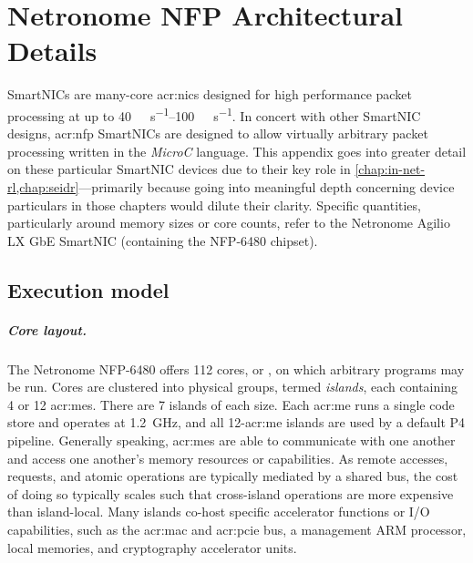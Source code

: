 \chapter{Netronome NFP Architectural Details}
\label{adx:nfp-arch}

 SmartNICs are many-core  \glspl{acr:nic} designed for high performance packet processing at up to \qtyrange{40}{100}{\giga\bit\per\second}.
In concert with other SmartNIC designs, \gls{acr:nfp} SmartNICs are designed to allow virtually arbitrary packet processing written in the \emph{MicroC} language.
This appendix goes into greater detail on these particular SmartNIC devices due to their key role in \cref{chap:in-net-rl,chap:seidr}---primarily because going into meaningful depth concerning device particulars in those chapters would dilute their clarity.
Specific quantities, particularly around memory sizes or core counts, refer to the Netronome Agilio LX GbE SmartNIC (containing the NFP-6480 chipset).

\section{Execution model}
\paragraph{Core layout.}
The Netronome NFP-6480 offers \num{112} cores, or , on which arbitrary programs may be run.
Cores are clustered into physical groups, termed \emph{islands}, each containing 4 or 12 \glspl{acr:me}.
There are 7 islands of each size.
Each \gls{acr:me} runs a single code store and operates at \qty{1.2}{\giga\hertz}, and all 12-\gls{acr:me} islands are used by a default P4 pipeline.
Generally speaking, \glspl{acr:me} are able to communicate with one another and access one another's memory resources or capabilities.
As remote accesses, requests, and atomic operations are typically mediated by a shared  bus, the cost of doing so typically scales such that cross-island operations are more expensive than island-local.
Many islands co-host specific accelerator functions or I/O capabilities, such as the \gls{acr:mac} and \gls{acr:pcie} bus, a management ARM processor, local memories, and cryptography accelerator units.

